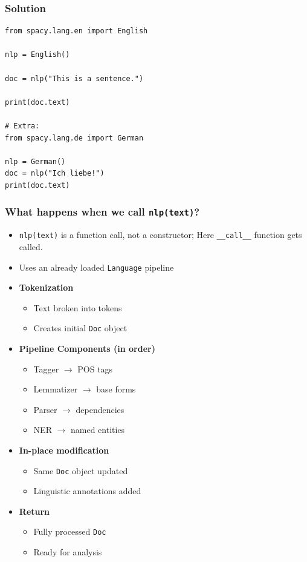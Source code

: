 \begin{frame}[fragile]\frametitle{Solution}

  \begin{lstlisting}
from spacy.lang.en import English

nlp = English()

doc = nlp("This is a sentence.")

print(doc.text)

# Extra:
from spacy.lang.de import German

nlp = German()
doc = nlp("Ich liebe!")
print(doc.text)
  \end{lstlisting}

\end{frame}

\begin{frame}\frametitle{What happens when we call \texttt{nlp(text)}?}

\begin{itemize}
\item \lstinline|nlp(text)| is a function call, not a constructor; Here \lstinline|__call__| function gets called.
\item Uses an already loaded \texttt{Language} pipeline
\item \textbf{Tokenization}
	\begin{itemize}
	\item Text broken into tokens
	\item Creates initial \texttt{Doc} object
	\end{itemize}

\item \textbf{Pipeline Components (in order)}
	\begin{itemize}
	\item Tagger $\rightarrow$ POS tags
	\item Lemmatizer $\rightarrow$ base forms
	\item Parser $\rightarrow$ dependencies
	\item NER $\rightarrow$ named entities
	\end{itemize}

\item \textbf{In-place modification}
	\begin{itemize}
	\item Same \texttt{Doc} object updated
	\item Linguistic annotations added
	\end{itemize}

\item \textbf{Return}
	\begin{itemize}
	\item Fully processed \texttt{Doc}
	\item Ready for analysis
	\end{itemize}

\end{itemize}

\end{frame}


